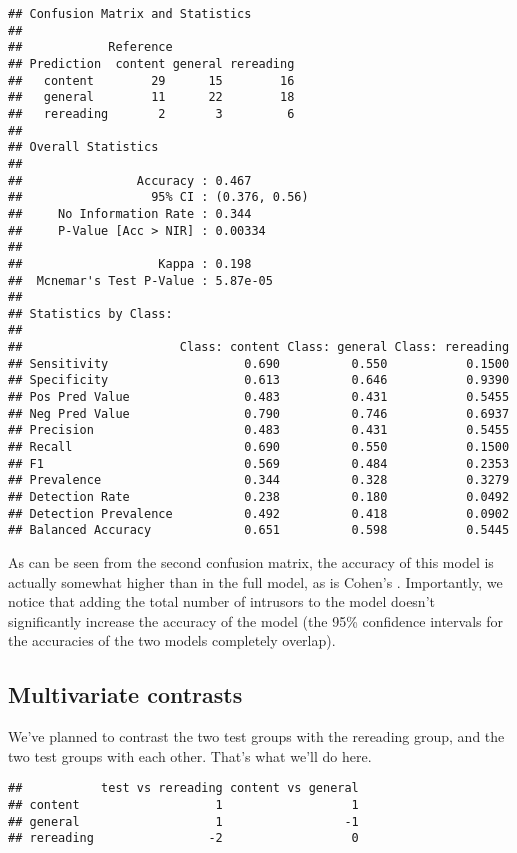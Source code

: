 \documentclass[11pt,]{article}
\begin{document}
\begin{verbatim}
## Confusion Matrix and Statistics
## 
##            Reference
## Prediction  content general rereading
##   content        29      15        16
##   general        11      22        18
##   rereading       2       3         6
## 
## Overall Statistics
##                                        
##                Accuracy : 0.467        
##                  95% CI : (0.376, 0.56)
##     No Information Rate : 0.344        
##     P-Value [Acc > NIR] : 0.00334      
##                                        
##                   Kappa : 0.198        
##  Mcnemar's Test P-Value : 5.87e-05     
## 
## Statistics by Class:
## 
##                      Class: content Class: general Class: rereading
## Sensitivity                   0.690          0.550           0.1500
## Specificity                   0.613          0.646           0.9390
## Pos Pred Value                0.483          0.431           0.5455
## Neg Pred Value                0.790          0.746           0.6937
## Precision                     0.483          0.431           0.5455
## Recall                        0.690          0.550           0.1500
## F1                            0.569          0.484           0.2353
## Prevalence                    0.344          0.328           0.3279
## Detection Rate                0.238          0.180           0.0492
## Detection Prevalence          0.492          0.418           0.0902
## Balanced Accuracy             0.651          0.598           0.5445
\end{verbatim}

As can be seen from the second confusion matrix, the accuracy of this
model is actually somewhat higher than in the full model, as is Cohen's
\textkappa. Importantly, we notice that adding the total number of
intrusors to the model doesn't significantly increase the accuracy of
the model (the 95\% confidence intervals for the accuracies of the two
models completely overlap).

\hypertarget{multivariate-contrasts}{%
\subsection{Multivariate contrasts}\label{multivariate-contrasts}}

We've planned to contrast the two test groups with the rereading group,
and the two test groups with each other. That's what we'll do here.

\begin{verbatim}
##           test vs rereading content vs general
## content                   1                  1
## general                   1                 -1
## rereading                -2                  0
\end{verbatim}
\end{document}
